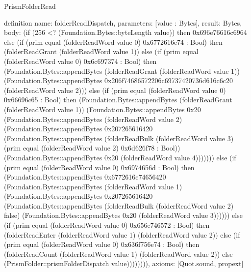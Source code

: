 \begin{lexlean}{PrismFolderRead}
\begin{semanticmodule}
definition{
  name: folderReadDispatch,
  parameters: [value : Bytes],
  result: Bytes,
  body: (if (256 <? (Foundation.Bytes::byteLength value)) then 0x696e76616c6964 else (if (prim equal (folderReadWord value 0) 0x6772616e74 : Bool) then (folderReadGrant (folderReadWord value 1)) else (if (prim equal (folderReadWord value 0) 0x6c697374 : Bool) then (Foundation.Bytes::appendBytes (folderReadGrant (folderReadWord value 1)) (Foundation.Bytes::appendBytes 0x206f74686572206c69737420736d616c6c20 (folderReadWord value 2))) else (if (prim equal (folderReadWord value 0) 0x66696c65 : Bool) then (Foundation.Bytes::appendBytes (folderReadGrant (folderReadWord value 1)) (Foundation.Bytes::appendBytes 0x20 (Foundation.Bytes::appendBytes (folderReadWord value 2) (Foundation.Bytes::appendBytes 0x207265616420 (Foundation.Bytes::appendBytes (folderReadBulk (folderReadWord value 3) (prim equal (folderReadWord value 2) 0x6d626f78 : Bool)) (Foundation.Bytes::appendBytes 0x20 (folderReadWord value 4))))))) else (if (prim equal (folderReadWord value 0) 0x6974656d : Bool) then (Foundation.Bytes::appendBytes 0x6772616e74656420 (Foundation.Bytes::appendBytes (folderReadWord value 1) (Foundation.Bytes::appendBytes 0x207265616420 (Foundation.Bytes::appendBytes (folderReadBulk (folderReadWord value 2) false) (Foundation.Bytes::appendBytes 0x20 (folderReadWord value 3)))))) else (if (prim equal (folderReadWord value 0) 0x656e746572 : Bool) then (folderReadEnter (folderReadWord value 1) (folderReadWord value 2)) else (if (prim equal (folderReadWord value 0) 0x636f756e74 : Bool) then (folderReadCount (folderReadWord value 1) (folderReadWord value 2)) else (PrismFolder::prismFolderDispatch value)))))))),
  axioms: [Quot.sound, propext]
}


\end{semanticmodule}
\end{lexlean}

